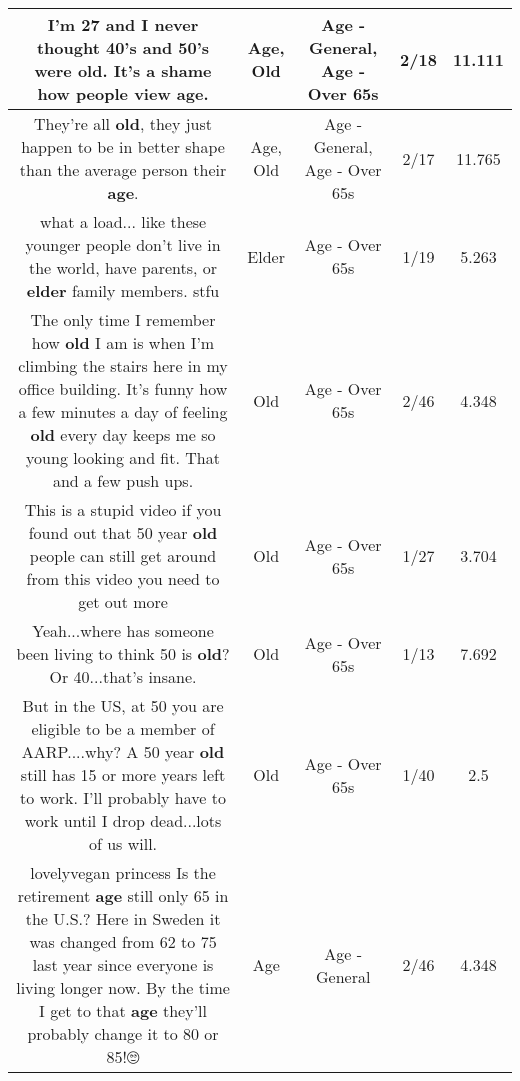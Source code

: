 \documentclass[11pt]{article}
\newlength\mylength
\begin{document}
\begin{center}
\begin{longtable}{|C{.65\mylength}|C{.30\mylength}|C{.12\mylength}|C{.12\mylength}|C{.12\mylength}|}
  \small I'm 27 and I never thought 40's and 50's were \textbf{old}. It's a shame how people view \textbf{age}.\normalsize   & Age, Old & Age - General, Age - Over 65s & 2/18 & 11.111 \\  \hline
  \small They're all \textbf{old}, they just happen to be in better shape than the average person their \textbf{age}.\normalsize   & Age, Old & Age - General, Age - Over 65s & 2/17 & 11.765 \\  \hline
  \small what a load... like these younger people don't live in the world, have parents, or \textbf{elder} family members. stfu\normalsize   & Elder & Age - Over 65s & 1/19 & 5.263 \\  \hline
  \small The only time I remember how \textbf{old} I am is when I'm climbing the stairs here in my office building. It's funny how a few minutes a day of feeling \textbf{old} every day keeps me so young looking and fit. That and a few push ups.\normalsize   & Old & Age - Over 65s & 2/46 & 4.348 \\  \hline
  \small This is a stupid video if you found out that 50 year \textbf{old} people can still get around from this video you need to get out more\normalsize   & Old & Age - Over 65s & 1/27 & 3.704 \\  \hline
  \small Yeah...where has someone been living to think 50 is \textbf{old}?  Or 40...that's insane.\normalsize   & Old & Age - Over 65s & 1/13 & 7.692 \\  \hline
  \small But in the US, at 50 you are eligible to be a member of AARP....why?  A 50 year \textbf{old} still has 15 or more years left to work.  I'll probably have to work until I drop dead...lots of us will.\normalsize   & Old & Age - Over 65s & 1/40 & 2.5 \\  \hline
  \small lovelyvegan princess Is the retirement \textbf{age} still only 65 in the U.S.? Here in Sweden it was changed from 62 to 75 last year since everyone is living longer now. By the time I get to that \textbf{age} they'll probably change it to 80 or 85!🙄\normalsize   & Age & Age - General & 2/46 & 4.348 \\  \hline

\end{longtable}
\end{center}
\end{document}
